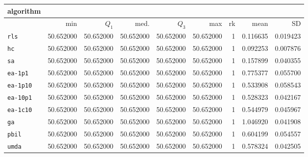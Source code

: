 \begin{center}
\begin{tabular}{@{}l*{5}{>{{}}N{2}{2}}>{{}}N{2}{0}N{1}{3}N{1}{3}@{}}
\toprule
{algorithm} &  &  \\
\midrule
& {min} & {$Q_1$} & {med.} & {$Q_3$} & {max} & {rk} & {mean} & {SD} \\
\midrule
\verb|rls| & {\color{blue}} 50.652000 & {\color{blue}} 50.652000 & {\color{blue}} 50.652000 & {\color{blue}} 50.652000 & {\color{blue}} 50.652000 & 1 & 0.116635 & 0.019423 \\
 \verb|hc| & {\color{blue}} 50.652000 & {\color{blue}} 50.652000 & {\color{blue}} 50.652000 & {\color{blue}} 50.652000 & {\color{blue}} 50.652000 & 1 & 0.092253 & 0.007876 \\
 \verb|sa| & {\color{blue}} 50.652000 & {\color{blue}} 50.652000 & {\color{blue}} 50.652000 & {\color{blue}} 50.652000 & {\color{blue}} 50.652000 & 1 & 0.157899 & 0.040355 \\
 \verb|ea-1p1| & {\color{blue}} 50.652000 & {\color{blue}} 50.652000 & {\color{blue}} 50.652000 & {\color{blue}} 50.652000 & {\color{blue}} 50.652000 & 1 & 0.775377 & 0.055700 \\
 \verb|ea-1p10| & {\color{blue}} 50.652000 & {\color{blue}} 50.652000 & {\color{blue}} 50.652000 & {\color{blue}} 50.652000 & {\color{blue}} 50.652000 & 1 & 0.533908 & 0.058543 \\
 \verb|ea-10p1| & {\color{blue}} 50.652000 & {\color{blue}} 50.652000 & {\color{blue}} 50.652000 & {\color{blue}} 50.652000 & {\color{blue}} 50.652000 & 1 & 0.528323 & 0.042167 \\
 \verb|ea-1c10| & {\color{blue}} 50.652000 & {\color{blue}} 50.652000 & {\color{blue}} 50.652000 & {\color{blue}} 50.652000 & {\color{blue}} 50.652000 & 1 & 0.544979 & 0.045967 \\
 \verb|ga| & {\color{blue}} 50.652000 & {\color{blue}} 50.652000 & {\color{blue}} 50.652000 & {\color{blue}} 50.652000 & {\color{blue}} 50.652000 & 1 & 1.046920 & 0.041908 \\
 \verb|pbil| & {\color{blue}} 50.652000 & {\color{blue}} 50.652000 & {\color{blue}} 50.652000 & {\color{blue}} 50.652000 & {\color{blue}} 50.652000 & 1 & 0.604199 & 0.054557 \\
 \verb|umda| & {\color{blue}} 50.652000 & {\color{blue}} 50.652000 & {\color{blue}} 50.652000 & {\color{blue}} 50.652000 & {\color{blue}} 50.652000 & 1 & 0.578324 & 0.042505 \\
 \bottomrule
\end{tabular}
\end{center}

